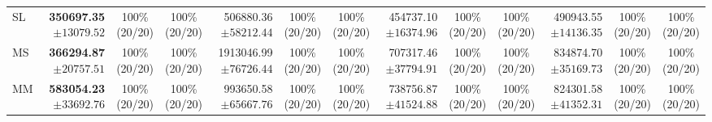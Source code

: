 \begin{table}[!t]
\begin{tabular}{@{}l*{4}{rcc}@{}}
SL & \shortstack[r]{\textbf{350697.35}\\$\pm 13079.52$} & \shortstack[c]{100\%\\(20/20)} & \shortstack[c]{100\%\\(20/20)} & \shortstack[r]{506880.36\\$\pm 58212.44$} & \shortstack[c]{100\%\\(20/20)} & \shortstack[c]{100\%\\(20/20)} & \shortstack[r]{454737.10\\$\pm 16374.96$} & \shortstack[c]{100\%\\(20/20)} & \shortstack[c]{100\%\\(20/20)} & \shortstack[r]{490943.55\\$\pm 14136.35$} & \shortstack[c]{100\%\\(20/20)} & \shortstack[c]{100\%\\(20/20)} \\
MS & \shortstack[r]{\textbf{366294.87}\\$\pm 20757.51$} & \shortstack[c]{100\%\\(20/20)} & \shortstack[c]{100\%\\(20/20)} & \shortstack[r]{1913046.99\\$\pm 76726.44$} & \shortstack[c]{100\%\\(20/20)} & \shortstack[c]{100\%\\(20/20)} & \shortstack[r]{707317.46\\$\pm 37794.91$} & \shortstack[c]{100\%\\(20/20)} & \shortstack[c]{100\%\\(20/20)} & \shortstack[r]{834874.70\\$\pm 35169.73$} & \shortstack[c]{100\%\\(20/20)} & \shortstack[c]{100\%\\(20/20)} \\
MM & \shortstack[r]{\textbf{583054.23}\\$\pm 33692.76$} & \shortstack[c]{100\%\\(20/20)} & \shortstack[c]{100\%\\(20/20)} & \shortstack[r]{993650.58\\$\pm 65667.76$} & \shortstack[c]{100\%\\(20/20)} & \shortstack[c]{100\%\\(20/20)} & \shortstack[r]{738756.87\\$\pm 41524.88$} & \shortstack[c]{100\%\\(20/20)} & \shortstack[c]{100\%\\(20/20)} & \shortstack[r]{824301.58\\$\pm 41352.31$} & \shortstack[c]{100\%\\(20/20)} & \shortstack[c]{100\%\\(20/20)} \\

\end{tabular}
\end{table}
